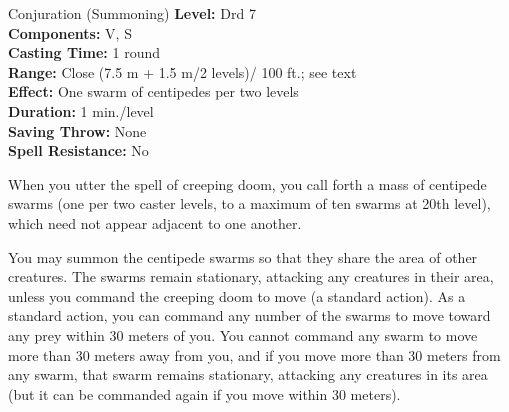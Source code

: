 {Conjuration (Summoning)}
{
	\textbf{Level:}
	Drd 7\\
	\textbf{Components:}
	V, S\\
	\textbf{Casting Time:}
	1 round\\
	\textbf{Range:}
	Close (7.5 m + 1.5 m/2 levels)/ 100 ft.; see text\\
	\textbf{Effect:}
	One swarm of centipedes per two levels\\
	\textbf{Duration:}
	1 min./level\\
	\textbf{Saving Throw:}
	None\\
	\textbf{Spell Resistance:}
	No\\
}
{
	When you utter the spell of creeping doom, you call forth a mass of centipede swarms (one per two caster levels, to a maximum of ten swarms at 20th level), which need not appear adjacent to one another.

	You may summon the centipede swarms so that they share the area of other creatures. The swarms remain stationary, attacking any creatures in their area, unless you command the creeping doom to move (a standard action). As a standard action, you can command any number of the swarms to move toward any prey within 30 meters of you. You cannot command any swarm to move more than 30 meters away from you, and if you move more than 30 meters from any swarm, that swarm remains stationary, attacking any creatures in its area (but it can be commanded again if you move within 30 meters).

}
